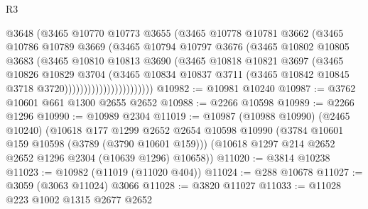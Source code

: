 \begin{lexlean}{R3}
\begin{coremodule}
                              @3648
                              (@3465
                                @10770
                                @10773
                                @3655
                                (@3465
                                  @10778
                                  @10781
                                  @3662
                                  (@3465
                                    @10786
                                    @10789
                                    @3669
                                    (@3465
                                      @10794
                                      @10797
                                      @3676
                                      (@3465
                                        @10802
                                        @10805
                                        @3683
                                        (@3465
                                          @10810
                                          @10813
                                          @3690
                                          (@3465
                                            @10818
                                            @10821
                                            @3697
                                            (@3465
                                              @10826
                                              @10829
                                              @3704
                                              (@3465
                                                @10834
                                                @10837
                                                @3711
                                                (@3465
                                                  @10842
                                                  @10845
                                                  @3718
                                                  @3720)))))))))))))))))))))))
@10982 := @10981 @10240
@10987 := @3762 @10601 @661 @1300 @2655 @2652
@10988 := @2266 @10598
@10989 := @2266 @1296
@10990 := @10989 @2304
@11019 := @10987
    (@10988 @10990)
    (@2465 @10240)
    (@10618
      @177
      @1299
      @2652
      @2654
      @10598
      @10990
      (@3784 @10601 @159 @10598 (@3789 (@3790 @10601 @159)))
      (@10618 @1297 @214 @2652 @2652 @1296 @2304 (@10639 @1296) @10658))
@11020 := @3814 @10238
@11023 := @10982 (@11019 (@11020 @404))
@11024 := @288 @10678
@11027 := @3059 (@3063 @11024) @3066
@11028 := @3820 @11027
@11033 := @11028 @223 @1002 @1315 @2677 @2652

\end{coremodule}
\end{lexlean}
